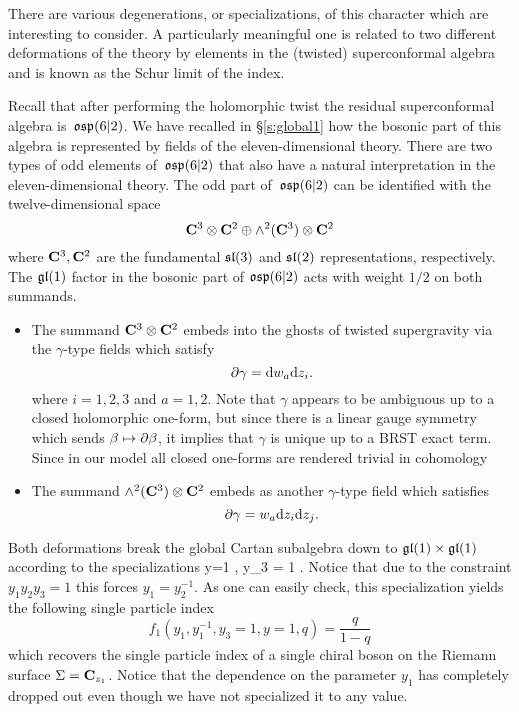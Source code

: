 \parsec
There are various degenerations, or specializations, of this character which are interesting to consider.
A particularly meaningful one is related to two different deformations of the theory by elements in the (twisted) superconformal algebra and is known as the Schur limit of the index.

Recall that after performing the holomorphic twist the residual superconformal algebra is~$\mathfrak{osp}(6|2)$.
We have recalled in \S\ref{s:global1} how the bosonic part of this algebra is represented by fields of the eleven-dimensional theory. 
There are two types of odd elements of~$\mathfrak{osp}(6|2)$ that also have a natural interpretation in the eleven-dimensional theory.
The odd part of~$\mathfrak{osp}(6|2)$ can be identified with the twelve-dimensional space
\[
\mathbf{C}^3 \otimes \mathbf{C}^2 \oplus \wedge^2(\mathbf{C}^3) \otimes \mathbf{C}^2 
\]
where $\mathbf{C}^3, \mathbf{C}^2$ are the fundamental $\mathfrak{sl}(3)$ and $\mathfrak{sl}(2)$ representations, respectively. 
The $\mathfrak{gl}(1)$ factor in the bosonic part of $\mathfrak{osp}(6|2)$ acts with weight $1/2$ on both summands. 

\begin{itemize}
\item The summand $\mathbf{C}^3 \otimes \mathbf{C}^2$ embeds into the ghosts of twisted supergravity via the $\gamma$-type fields which satisfy
\[
\partial \gamma = {\rm d} w_a {\rm d} z_i .
\]
where $i=1,2,3$ and $a = 1,2$.
Note that $\gamma$ appears to be ambiguous up to a closed holomorphic one-form, but since there is a linear gauge symmetry which sends $\beta \mapsto \partial \beta$, it implies that $\gamma$ is unique up to a BRST exact term. 
Since in our model all closed one-forms are rendered trivial in cohomology
\item The summand $\wedge^2(\mathbf{C}^3) \otimes \mathbf{C}^2$ embeds as another $\gamma$-type field which satisfies 
\[
\partial \gamma = w_a {\rm d} z_i {\rm d} z_j .
\]
\end{itemize}

Both deformations break the global Cartan subalgebra down to $\mathfrak{gl}(1) \times \mathfrak{gl}(1)$ according to the specializations
\beqn\label{eqn:special1}
y=1 , \quad y_3 = 1 .
\eeqn
Notice that due to the constraint $y_1y_2y_3=1$ this forces $y_1 = y_2^{-1}$.
As one can easily check, this specialization yields the following single particle index
\[
f_{1}(y_1, y_1^{-1},y_3=1, y=1, q) = \frac{q}{1-q} 
\]
which recovers the single particle index of a single chiral boson on the Riemann surface $\Sigma = \mathbf{C}_{z_1}$. 
Notice that the dependence on the parameter $y_1$ has completely dropped out even though we have not specialized it to any value.

